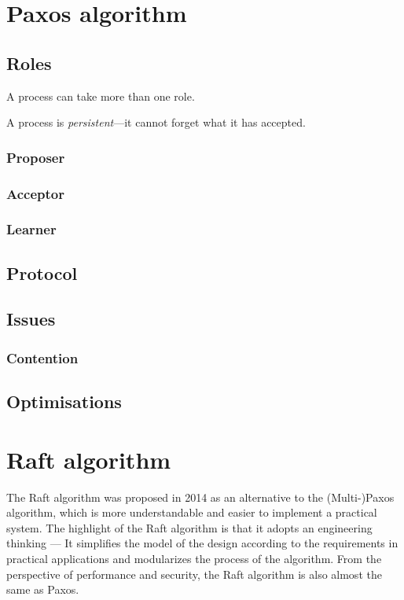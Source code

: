 \documentclass[12pt, a4paper]{article}
\begin{document}
\section{Paxos algorithm}

\subsection{Roles}

A process can take more than one role.

A process is \textit{persistent}---it cannot forget what it has accepted.

  \subsubsection{Proposer}

  \subsubsection{Acceptor}

  \subsubsection{Learner}

\subsection{Protocol}

\subsection{Issues}

  \subsubsection{Contention}

\subsection{Optimisations}


\section{Raft algorithm}
The Raft algorithm was proposed in 2014\cite{conf/usenix/OngaroO14} as an alternative to the (Multi-)Paxos algorithm, which is more
understandable and easier to implement a practical system. The highlight of the Raft algorithm is that it adopts an
engineering thinking --- It simplifies the model of the design according to the requirements in practical applications and
modularizes the process of the algorithm. From the perspective of performance and security, the Raft algorithm is also almost
the same as Paxos.
\end{document}
